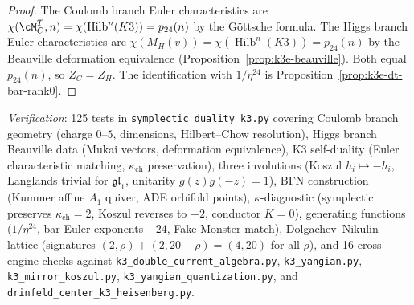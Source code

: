 \begin{proof}
The Coulomb branch Euler characteristics are $\chi(\cM_C^T, n) = \chi(\operatorname{Hilb}^n(K3)) = p_{24}(n)$ by the G\"ottsche formula.  The Higgs branch Euler characteristics are $\chi(M_H(v)) = \chi(\operatorname{Hilb}^n(K3)) = p_{24}(n)$ by the Beauville deformation equivalence (Proposition~\ref{prop:k3e-beauville}).  Both equal $p_{24}(n)$, so $Z_C = Z_H$.  The identification with $1/\eta^{24}$ is Proposition~\ref{prop:k3e-dt-bar-rank0}.
\end{proof}

\noindent\textit{Verification}: 125 tests in \texttt{symplectic\_duality\_k3.py} covering Coulomb branch geometry (charge $0$--$5$, dimensions, Hilbert--Chow resolution), Higgs branch Beauville data (Mukai vectors, deformation equivalence), K3 self-duality (Euler characteristic matching, $\kappa_{\mathrm{ch}}$ preservation), three involutions (Koszul $h_i \mapsto -h_i$, Langlands trivial for $\mathfrak{gl}_1$, unitarity $g(z)g(-z) = 1$), BFN construction (Kummer affine $A_1$ quiver, ADE orbifold points), $\kappa$-diagnostic (symplectic preserves $\kappa_{\mathrm{ch}} = 2$, Koszul reverses to $-2$, conductor $K = 0$), generating functions ($1/\eta^{24}$, bar Euler exponents $-24$, Fake Monster match), Dolgachev--Nikulin lattice (signatures $(2,\rho) + (2,20-\rho) = (4,20)$ for all $\rho$), and 16 cross-engine checks against \texttt{k3\_double\_current\_algebra.py}, \texttt{k3\_yangian.py}, \texttt{k3\_mirror\_koszul.py}, \texttt{k3\_yangian\_quantization.py}, and \texttt{drinfeld\_center\_k3\_heisenberg.py}.

